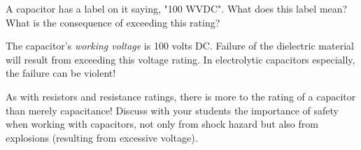 

A capacitor has a label on it saying, "100 WVDC".  What does this label mean?  What is the consequence of exceeding this rating?







The capacitor's {\it working voltage} is 100 volts DC.  Failure of the dielectric material will result from exceeding this voltage rating.  In electrolytic capacitors especially, the failure can be violent!







As with resistors and resistance ratings, there is more to the rating of a capacitor than merely capacitance!  Discuss with your students the importance of safety when working with capacitors, not only from shock hazard but also from explosions (resulting from excessive voltage).




